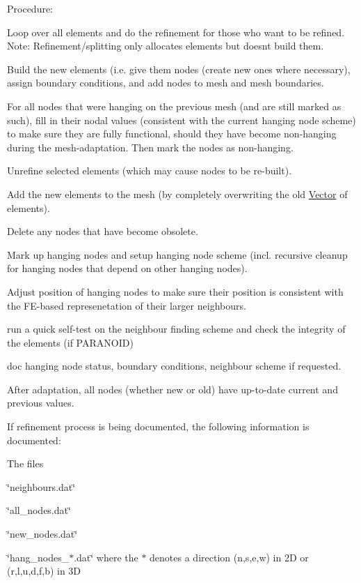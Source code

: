 Procedure\+:
\begin{DoxyItemize}
\item Loop over all elements and do the refinement for those who want to be refined. Note\+: Refinement/splitting only allocates elements but doesn\textquotesingle{}t build them.
\item Build the new elements (i.\+e. give them nodes (create new ones where necessary), assign boundary conditions, and add nodes to mesh and mesh boundaries.
\item For all nodes that were hanging on the previous mesh (and are still marked as such), fill in their nodal values (consistent with the current hanging node scheme) to make sure they are fully functional, should they have become non-\/hanging during the mesh-\/adaptation. Then mark the nodes as non-\/hanging.
\item Unrefine selected elements (which may cause nodes to be re-\/built).
\item Add the new elements to the mesh (by completely overwriting the old \hyperlink{classoomph_1_1Vector}{Vector} of elements).
\item Delete any nodes that have become obsolete.
\item Mark up hanging nodes and setup hanging node scheme (incl. recursive cleanup for hanging nodes that depend on other hanging nodes).
\item Adjust position of hanging nodes to make sure their position is consistent with the F\+E-\/based represenetation of their larger neighbours.
\item run a quick self-\/test on the neighbour finding scheme and check the integrity of the elements (if P\+A\+R\+A\+N\+O\+ID)
\item doc hanging node status, boundary conditions, neighbour scheme if requested.
\end{DoxyItemize}

After adaptation, all nodes (whether new or old) have up-\/to-\/date current and previous values.

If refinement process is being documented, the following information is documented\+:
\begin{DoxyItemize}
\item The files
\begin{DoxyItemize}
\item \char`\"{}neighbours.\+dat\char`\"{}
\item \char`\"{}all\+\_\+nodes.\+dat\char`\"{}
\item \char`\"{}new\+\_\+nodes.\+dat\char`\"{}
\item \char`\"{}hang\+\_\+nodes\+\_\+$\ast$.\+dat\char`\"{} where the $\ast$ denotes a direction (n,s,e,w) in 2D or (r,l,u,d,f,b) in 3D
\end{DoxyItemize}
\end{DoxyItemize}

